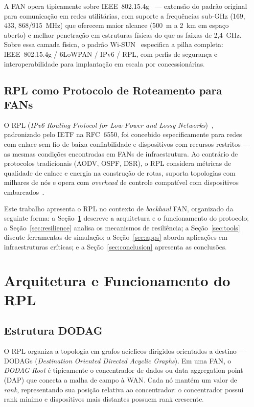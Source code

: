 \documentclass[conference]{IEEEtran}
\begin{document}
A FAN opera tipicamente sobre IEEE~802.15.4g~\cite{ieee802154g} --- extensão
do padrão original para comunicação em redes utilitárias, com suporte a
frequências sub-GHz (169, 433, 868/915~MHz) que oferecem maior alcance (500~m
a 2~km em espaço aberto) e melhor penetração em estruturas físicas do que as
faixas de 2,4~GHz. Sobre essa camada física, o padrão Wi-SUN~\cite{wisun2022}
especifica a pilha completa: IEEE~802.15.4g / 6LoWPAN / IPv6 / RPL, com perfis
de segurança e interoperabilidade para implantação em escala por concessionárias.

\subsection{RPL como Protocolo de Roteamento para FANs}

O RPL (\textit{IPv6 Routing Protocol for Low-Power and Lossy
Networks})~\cite{winter2012rpl}, padronizado pelo IETF na RFC~6550, foi
concebido especificamente para redes com enlace sem fio de baixa confiabilidade
e dispositivos com recursos restritos --- as mesmas condições encontradas em
FANs de infraestrutura. Ao contrário de protocolos tradicionais (AODV, OSPF,
DSR), o RPL considera métricas de qualidade de enlace e energia na construção
de rotas, suporta topologias com milhares de nós e opera com \textit{overhead} de
controle compatível com dispositivos embarcados~\cite{ancillotti2013rpl}.

Este trabalho apresenta o RPL no contexto de \textit{backhaul} FAN, organizado da
seguinte forma: a Seção~\ref{sec:arch} descreve a arquitetura e o funcionamento
do protocolo; a Seção~\ref{sec:resilience} analisa os mecanismos de resiliência;
a Seção~\ref{sec:tools} discute ferramentas de simulação; a
Seção~\ref{sec:apps} aborda aplicações em infraestruturas críticas; e a
Seção~\ref{sec:conclusion} apresenta as conclusões.

\section{Arquitetura e Funcionamento do RPL}
\label{sec:arch}

\subsection{Estrutura DODAG}

O RPL organiza a topologia em grafos acíclicos dirigidos orientados a destino
--- DODAGs (\textit{Destination Oriented Directed Acyclic Graphs}). Em uma FAN,
o \textit{DODAG Root} é tipicamente o concentrador de dados ou data aggregation
point (DAP) que conecta a malha de campo à WAN. Cada nó mantém um valor de
\textit{rank}, representando sua posição relativa ao concentrador: o concentrador
possui rank mínimo e dispositivos mais distantes possuem rank crescente.
\end{document}
